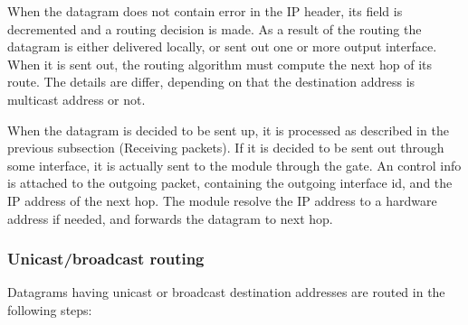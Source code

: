 
When the datagram does not contain error in the IP header,
its  field is decremented and a routing decision
is made. As a result of the routing the datagram is either
delivered locally, or sent out one or more output interface.
When it is sent out, the routing algorithm must compute the
next hop of its route. The details are differ, depending on
that the destination address is multicast address or not.

When the datagram is decided to be sent up, it is processed
as described in the previous subsection (Receiving packets).
If it is decided to be sent out through some interface, it
is actually sent to the  module through the
 gate. An  control
info is attached to the outgoing packet, containing the
outgoing interface id, and the IP address of the next hop.
The  module resolve the IP address to a hardware
address if needed, and forwards the datagram to next hop.

\subsubsection*{Unicast/broadcast routing}

Datagrams having unicast or broadcast destination addresses are
routed in the following steps:

